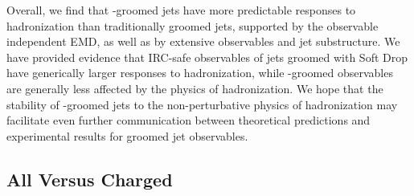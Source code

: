 Overall, we find that \PIRANHA{}-groomed jets have more predictable responses to hadronization than traditionally groomed jets, supported by the observable independent EMD, as well as by extensive observables and jet substructure.
%
We have provided evidence that IRC-safe observables of jets groomed with Soft Drop have generically larger responses to hadronization, while \PIRANHA{}-groomed observables are generally less affected by the physics of hadronization.
%
We hope that the stability of \PIRANHA{}-groomed jets to the non-perturbative physics of hadronization may facilitate even further communication between theoretical predictions and experimental results for groomed jet observables.

\subsection{All Versus Charged}
\label{sec:all_v_charged}
